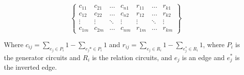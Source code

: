 \documentclass[11pt, a4paper, UKenglish]{article}
\begin{document}

    \[\begin{Bmatrix}
          c_{11} & c_{21} & \ldots &c_{n1} & r_{11} & \ldots  & r_{k1}\\
          c_{12} & c_{22} & \ldots &c_{n2} & r_{12} & \ldots  & r_{k2}\\
          \vdots & \vdots & \ddots & \vdots & \vdots & \ddots & \vdots \\
          c_{1m} & c_{2m} & \ldots &c_{nm} & r_{1m} & \ldots  & r_{km}
    \end{Bmatrix}\]

    Where $c_{ij} = \sum_{e_j\in P_i} 1 - \sum_{e_j*\in P_i}1$ and $r_{ij} = \sum_{e_j\in R_i} 1 - \sum_{e_j^*\in R_i}1$, where $P_i$ is the generator circuits and $R_i$ is the relation circuits, and $e_j$ is an edge and $e_j^*$ is the inverted edge.
\end{document}
